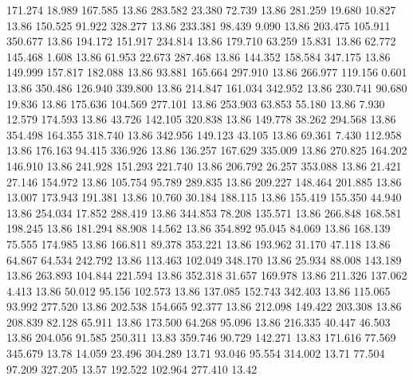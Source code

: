  171.274   18.989  167.585        13.86
 283.582   23.380   72.739        13.86
 281.259   19.680   10.827        13.86
 150.525   91.922  328.277        13.86
 233.381   98.439    9.090        13.86
 203.475  105.911  350.677        13.86
 194.172  151.917  234.814        13.86
 179.710   63.259   15.831        13.86
  62.772  145.468    1.608        13.86
  61.953   22.673  287.468        13.86
 144.352  158.584  347.175        13.86
 149.999  157.817  182.088        13.86
  93.881  165.664  297.910        13.86
 266.977  119.156    0.601        13.86
 350.486  126.940  339.800        13.86
 214.847  161.034  342.952        13.86
 230.741   90.680   19.836        13.86
 175.636  104.569  277.101        13.86
 253.903   63.853   55.180        13.86
   7.930   12.579  174.593        13.86
  43.726  142.105  320.838        13.86
 149.778   38.262  294.568        13.86
 354.498  164.355  318.740        13.86
 342.956  149.123   43.105        13.86
  69.361    7.430  112.958        13.86
 176.163   94.415  336.926        13.86
 136.257  167.629  335.009        13.86
 270.825  164.202  146.910        13.86
 241.928  151.293  221.740        13.86
 206.792   26.257  353.088        13.86
  21.421   27.146  154.972        13.86
 105.754   95.789  289.835        13.86
 209.227  148.464  201.885        13.86
  13.007  173.943  191.381        13.86
  10.760   30.184  188.115        13.86
 155.419  155.350   44.940        13.86
 254.034   17.852  288.419        13.86
 344.853   78.208  135.571        13.86
 266.848  168.581  198.245        13.86
 181.294   88.908   14.562        13.86
 354.892   95.045   84.069        13.86
 168.139   75.555  174.985        13.86
 166.811   89.378  353.221        13.86
 193.962   31.170   47.118        13.86
  64.867   64.534  242.792        13.86
 113.463  102.049  348.170        13.86
  25.934   88.008  143.189        13.86
 263.893  104.844  221.594        13.86
 352.318   31.657  169.978        13.86
 211.326  137.062    4.413        13.86
  50.012   95.156  102.573        13.86
 137.085  152.743  342.403        13.86
 115.065   93.992  277.520        13.86
 202.538  154.665   92.377        13.86
 212.098  149.422  203.308        13.86
 208.839   82.128   65.911        13.86
 173.500   64.268   95.096        13.86
 216.335   40.447   46.503        13.86
 204.056   91.585  250.311        13.83
 359.746   90.729  142.271        13.83
 171.616   77.569  345.679        13.78
  14.059   23.496  304.289        13.71
  93.046   95.554  314.002        13.71
  77.504   97.209  327.205        13.57
 192.522  102.964  277.410        13.42
